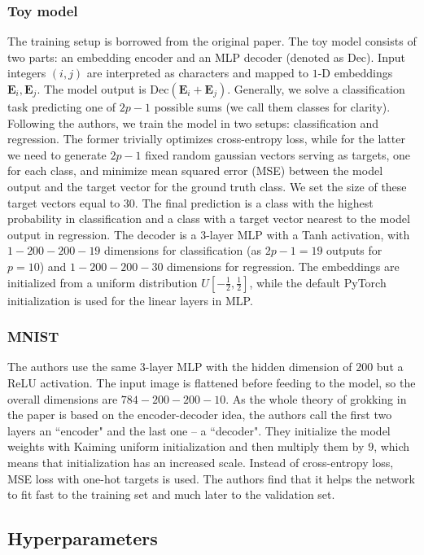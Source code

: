\subsubsection{Toy model} The training setup is borrowed from the original paper. The toy model consists of two parts: an embedding encoder and an MLP decoder (denoted as $\text{Dec}$). Input integers $(i, j)$ are interpreted as characters and mapped to $1$-D embeddings $\mathbf{E}_i, \mathbf{E}_j$. The model output is $\text{Dec}(\mathbf{E}_i + \mathbf{E}_j)$. Generally, we solve a classification task predicting one of $2p-1$ possible sums (we call them classes for clarity). Following the authors, we train the model in two setups: classification and regression. The former trivially optimizes cross-entropy loss, while for the latter we need to generate $2p-1$ fixed random gaussian vectors serving as targets, one for each class, and minimize mean squared error (MSE) between the model output and the target vector for the ground truth class. We set the size of these target vectors equal to 30. The final prediction is a class with the highest probability in classification and a class with a target vector nearest to the model output in regression. The decoder is a $3$-layer MLP with a Tanh activation, with $1-200-200-19$ dimensions for classification (as $2p-1 = 19$ outputs for $p=10$) and $1-200-200-30$ dimensions for regression. The embeddings are initialized from a uniform distribution $U[-\frac{1}{2}, \frac{1}{2}]$, while the default PyTorch initialization is used for the linear layers in MLP.

\subsubsection{MNIST}
The authors use the same $3$-layer MLP with the hidden dimension of $200$ but a ReLU activation. The input image is flattened before feeding to the model, so the overall dimensions are $784 - 200 - 200 - 10$. As the whole theory of grokking in the paper is based on the encoder-decoder idea, the authors call the first two layers an ``encoder" and the last one -- a ``decoder". They initialize the model weights with Kaiming uniform initialization \cite{kaiming_init} and then multiply them by $9$, which means that initialization has an increased scale. Instead of cross-entropy loss, MSE loss with one-hot targets is used. The authors find that it helps the network to fit fast to the training set and much later to the validation set.

\subsection{Hyperparameters}

